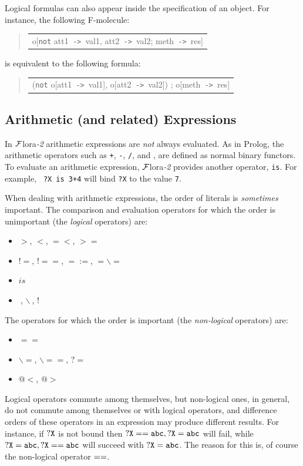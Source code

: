 \documentclass[11pt]{article}
\newenvironment{qrules}{\begin{quote}\tt\begin{tabular}[t]{l}}%
{\end{tabular}\end{quote}}
\newcommand{\mvd}{{\mbox{\tt \,->\,}}}  %
\newcommand{\FLORA}{{\mbox{\sc ${\cal F}${lora}\rm\emph{-2}}}\xspace}
\newcommand{\TNOT}{{{\tt not}}\xspace}
\begin{document}
%
Logical formulas can also appear inside the specification of an object. For
instance, the following F-molecule:
\begin{qrules}
o[\TNOT att1{\mvd}val1, att2{\mvd}val2; meth{\mvd}res]
\end{qrules}
is equivalent to the following formula:
\begin{qrules}
(\TNOT o[att1{\mvd}val1], o[att2{\mvd}val2]) ; o[meth{\mvd}res]
\end{qrules}


\subsection{Arithmetic (and related) Expressions}


In \FLORA arithmetic expressions are \emph{not} always evaluated. As in
Prolog, the arithmetic operators such as {\tt +}, {\tt -}, {\tt /}, and
{\tt *}, are defined as normal binary functors. To evaluate an arithmetic
expression, \FLORA provides another operator, {\tt is}.  For example, {\tt
  ?X is 3+4} will bind {\tt ?X} to the value {\tt 7}.

When dealing with arithmetic expressions, the order of literals is
\emph{sometimes} important.
The comparison and evaluation operators for which the order is unimportant
(the \emph{logical} operators)  are:
\begin{itemize}
\item  $>$, $<$, $=<$, $>=$
\item  $!=$, $!==$, $=:=$, $=\backslash=$
\item $is$
\item $~$, $\backslash~$, $!~$
\end{itemize}
The operators for which the order is important (the \emph{non-logical}
operators) are:
\begin{itemize}
\item  $==$
\item  $\backslash=$, $\backslash==$, $?=$
\item  $@<$, $@>$
\end{itemize}
Logical operators commute among themselves, but non-logical ones, in
general, do not commute among themselves or with logical operators, and
difference orders of these operators in an expression  may produce different
results. For instance, if $\tt ?X$ is not bound then $\tt ?X == abc, ?X=abc$ will
fail, while  $\tt ?X=abc, ?X == abc$ will succeed with $\tt ?X = abc$.
The reason for this is, of course the non-logical operator $\tt ==$.
\end{document}
